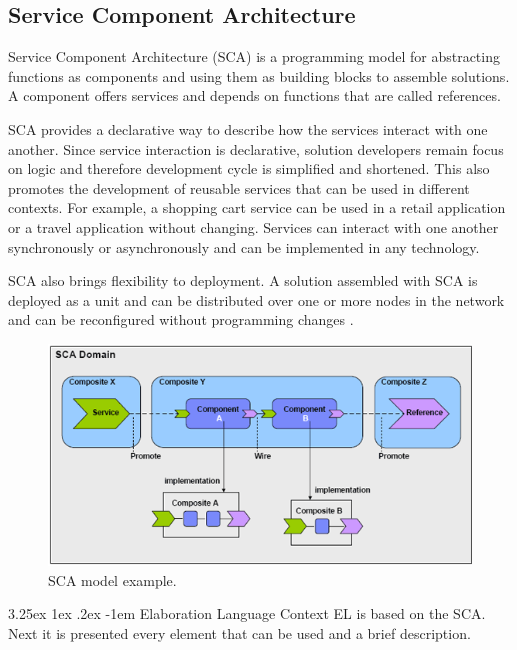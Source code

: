 \documentclass{report}
\makeatletter
\renewcommand\paragraph{\@startsection{paragraph}{5}{\z@}%
	{3.25ex \@plus1ex \@minus.2ex}%
	{-1em}%
	{\normalfont\normalsize\bfseries}}
\makeatother
\begin{document}
		\subsection{Service Component Architecture}
		
		\par Service Component Architecture (SCA) is a programming model for abstracting functions as components and using them as building blocks to assemble solutions. A component offers services and depends on functions that are called references.
		\par SCA provides a declarative way to describe how the services interact with one another. Since service interaction is declarative, solution developers remain focus on logic and therefore development cycle is simplified and shortened. This also promotes the development of reusable services that can be used in different contexts. For example, a shopping cart service can be used in a retail application or a travel application without changing. Services can interact with one another synchronously or asynchronously and can be implemented in any technology.
		\par SCA also brings flexibility to deployment. A solution assembled with SCA is deployed as a unit and can be distributed over one or more nodes in the network and can be reconfigured without programming changes \cite{apachetuscany}.
	
		\begin{figure} [H]
			\centering
			\includegraphics[width=0.8\linewidth]{Images/sca}
			\caption{SCA model example\cite{theenterprisearchitect}.}
			\label{fig:sca}
		\end{figure}
		
		\paragraph{Elaboration Language Context} EL is based on the SCA. Next it is presented every element that can be used and a brief description.
		
\end{document}
